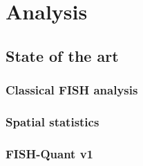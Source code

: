 
\graphicspath{{../../figures/chapter_4/}}


\chapter{Analysis} \label{chap:chapter_4}
\minitoc
\newpage


\section{State of the art}






\subsection{Classical \ac{FISH} analysis}

\subsection{Spatial statistics}

\subsection{FISH-Quant v1}

